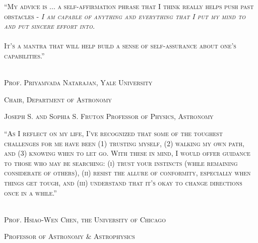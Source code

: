 \documentclass[12pt]{article}
\begin{document}


\pagebreak 
\strut\vspace{200pt}

\noindent \textsc{``My advice is ... a self-affirmation phrase that I think really helps push past obstacles - \textsl{I am capable of anything and everything that I put my mind to and put sincere effort into.}\\
\\
It's a mantra that will help build a sense of self-assurance about one's capabilities.''}\\
\\
\strut\hfill \textemdash \textsc{Prof. Priyamvada Natarajan, Yale University}\\
\strut \hfill \footnotesize{\textsc{Chair, Department of Astronomy}}\\
\strut \hfill \footnotesize{\textsc{Joseph S. and Sophia S. Fruton Professor of Physics, Astronomy}}
\normalsize




\pagebreak
\strut\vspace{175pt}

\noindent \textsc{``As I reflect on my life, I've recognized that some of the toughest challenges for me have been (1) trusting myself, (2) walking my own path, and (3) knowing when to let go. With these in mind, I would offer guidance to those who may be searching: (i) trust your instincts (while remaining considerate of others), (ii) resist the allure of conformity, especially when things get tough, and (iii) understand that it's okay to change directions once in a while.''}\\
\\
\strut\hfill \textemdash \textsc{Prof. Hsiao-Wen Chen, the University of Chicago}\\
\strut \hfill \footnotesize{\textsc{Professor of Astronomy \& Astrophysics}}
\normalsize




\pagebreak
\strut \vspace{150pt}
\end{document}
